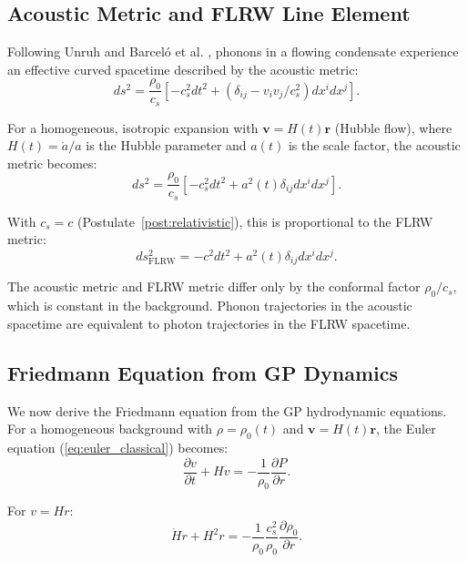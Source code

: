 \documentclass[11pt,a4paper]{article}
\theoremstyle{definition}
\theoremstyle{remark}
\begin{document}
\subsection{Acoustic Metric and FLRW Line Element}
\label{sec:acoustic_flrw}

Following Unruh \cite{Unruh1981} and Barceló et al. \cite{Barcelo2005}, phonons in a flowing condensate experience an effective curved spacetime described by the acoustic metric:
\begin{equation}
\label{eq:acoustic_metric_general}
ds^2 = \frac{\rho_0}{c_s}\left[-c_s^2 dt^2 + (\delta_{ij} - v_i v_j/c_s^2)dx^i dx^j\right].
\end{equation}

For a homogeneous, isotropic expansion with $\mathbf{v} = H(t)\mathbf{r}$ (Hubble flow), where $H(t) = \dot{a}/a$ is the Hubble parameter and $a(t)$ is the scale factor, the acoustic metric becomes:
\begin{equation}
\label{eq:acoustic_metric_hubble}
ds^2 = \frac{\rho_0}{c_s}\left[-c_s^2 dt^2 + a^2(t)\delta_{ij}dx^i dx^j\right].
\end{equation}

With $c_s = c$ (Postulate~\ref{post:relativistic}), this is proportional to the FLRW metric:
\begin{equation}
\label{eq:flrw_metric}
ds^2_{\mathrm{FLRW}} = -c^2 dt^2 + a^2(t)\delta_{ij}dx^i dx^j.
\end{equation}

The acoustic metric and FLRW metric differ only by the conformal factor $\rho_0/c_s$, which is constant in the background. Phonon trajectories in the acoustic spacetime are equivalent to photon trajectories in the FLRW spacetime.

\subsection{Friedmann Equation from GP Dynamics}
\label{sec:friedmann_derivation}

We now derive the Friedmann equation from the GP hydrodynamic equations. For a homogeneous background with $\rho = \rho_0(t)$ and $\mathbf{v} = H(t)\mathbf{r}$, the Euler equation (\ref{eq:euler_classical}) becomes:
\begin{equation}
\label{eq:euler_homogeneous}
\frac{\partial v}{\partial t} + H v = -\frac{1}{\rho_0}\frac{\partial P}{\partial r}.
\end{equation}

For $v = H r$:
\begin{equation}
\dot{H}r + H^2 r = -\frac{1}{\rho_0}\frac{c_s^2}{\rho_0}\frac{\partial \rho_0}{\partial r}.
\end{equation}
\end{document}

